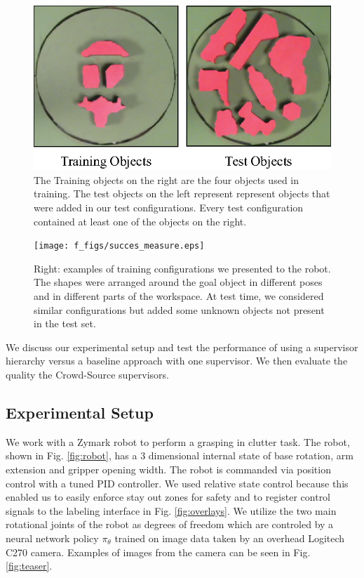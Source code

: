 \documentclass[10pt, conference]{ieeeconf}      %
\begin{document}
\begin{figure}[t]
\centering
\includegraphics{f_figs/shapes_set.eps}

\caption{\footnotesize  The Training objects on the right are the four objects used in training. The test objects on the
left represent represent objects that were added in our test configurations. Every test configuration contained at least
one of the objects on the right.}

\label{fig:shape_set}
\end{figure}


\begin{figure}[t]
\centering
\texttt{[image: f\_figs/succes\_measure.eps]}

\caption{\footnotesize  Right: examples of training configurations we presented to the robot. The shapes were arranged
around the goal object in different poses and in different parts of the workspace. At test time, we considered similar configurations but 
added some unknown objects not present in the test set. }
\vspace*{-20pt}
\label{fig:suc_meas}
\end{figure}

We discuss our experimental setup and test the performance of using a supervisor hierarchy versus a baseline approach
with one supervisor. We then evaluate the quality the Crowd-Source supervisors. 

\subsection{Experimental Setup}
We work with a Zymark robot to perform a grasping in clutter task. The robot, shown in Fig. \ref{fig:robot}, has a 3
dimensional internal state of base rotation, arm extension and gripper opening width. The robot is commanded via position 
control with a tuned PID controller. We used
relative state control because this enabled us to easily enforce stay out zones for safety
and to register control signals to the labeling interface in Fig. \ref{fig:overlays}. We utilize the two main rotational joints of the
robot as degrees of freedom which are controled by a neural network policy $\pi_{\theta}$ trained on image data taken by
an overhead Logitech C270 camera. Examples of images from the camera can be seen in Fig. \ref{fig:teaser}.
\end{document}
